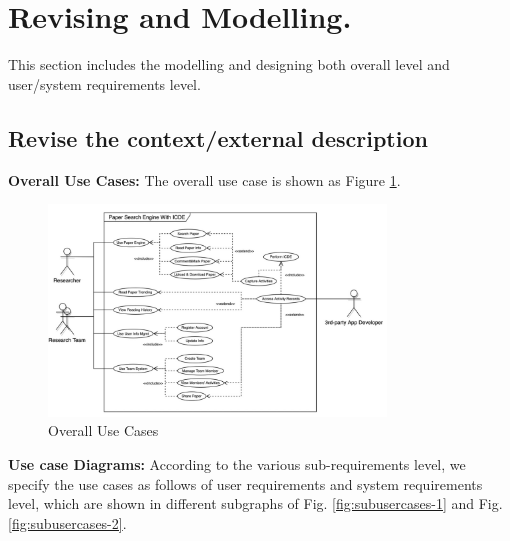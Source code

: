 \documentclass[]{article}
\begin{document}
\section{Revising and Modelling.}
This section includes the modelling and designing both overall level and user/system requirements level.

\subsection{Revise the context/external description}

\textbf{Overall Use Cases: }  The overall use case is shown as Figure \ref{fig:oucs}.

\begin{figure}[!ht]
	\centering
	\includegraphics[width=0.8\textwidth]{./img/Figure_overall-use-cases.jpg}
	\caption{Overall Use Cases}
	\label{fig:oucs}
\end{figure}

\textbf{Use case Diagrams: }  According to the various sub-requirements level,
we specify the use cases as follows of user requirements and system requirements level,
which are shown in different subgraphs of Fig. \ref{fig:subusercases-1} and Fig. \ref{fig:subusercases-2}.
\end{document}
